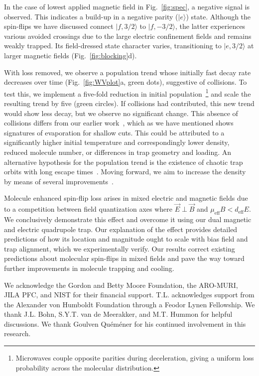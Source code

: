 \documentclass[%
 reprint,
 amsmath,amssymb,
 aps,
prl,
]{revtex4-1}
\newcommand{\red}[1]{{\color{black} #1}}
\newcommand{\epb}{{$\vec{E}\!\perp\!\vec{B}$}}
\begin{document}
In the case of lowest applied magnetic field in Fig.~\ref{fig:spec}, a negative signal is observed. 
This indicates a build-up in a negative parity ($|e\rangle$) state. 
Although the spin-flips we have discussed connect $|f,3/2\rangle$ to $|f,-3/2\rangle$, the latter experiences various avoided crossings due to the large electric confinement fields and remains weakly trapped.  
Its field-dressed state character varies, transitioning to $|e,3/2\rangle$ at larger magnetic fields (Fig.~\ref{fig:blocking}d). 

With loss removed, we observe a population trend whose initially fast decay rate decreases over time (Fig.~\ref{fig:WVplot}a, green dots), suggestive of collisions. 
To test this, we implement a five-fold reduction in initial population~\footnote{Microwaves couple opposite parities during deceleration, giving a uniform loss probability across the molecular distribution.} and scale the resulting trend by five (green circles). 
If collisions had contributed, this new trend would show less decay, but we observe no significant change. 
This absence of collisions differs from our earlier work~\cite{Stuhl2012evap}, which as we have mentioned shows signatures of evaporation for shallow cuts. 
This could be attributed to a significantly higher initial temperature and correspondingly lower density, reduced molecule number, or differences in trap geometry and loading. 
\red{An alternative hypothesis for the population trend is the existence of chaotic trap orbits with long escape times~\cite{Gonzalez-Ferez2014}.} 
Moving forward, we aim to increase the density by means of several improvements~\cite{Even2015,Segev2017}.



Molecule enhanced spin-flip loss arises in mixed electric and magnetic fields due to a competition between field quantization axes where \epb{} and $\mu_\text{eff}B<d_\text{eff}E$. 
We conclusively demonstrate this effect and overcome it using our dual magnetic and electric quadrupole trap. 
Our explanation of the effect provides detailed predictions of how its location and magnitude ought to scale with bias field and trap alignment, which we experimentally verify. 
Our results correct existing predictions about molecular spin-flips in mixed fields and pave the way toward further improvements in molecule trapping and cooling.

\acknowledgements
We acknowledge the Gordon and Betty Moore Foundation, the ARO-MURI, JILA PFC, and NIST for their financial support. 
T.L. acknowledges support from the Alexander von Humboldt Foundation through a Feodor Lynen Fellowship. 
We thank J.L. Bohn, S.Y.T. van de Meerakker, and M.T. Hummon for helpful discussions. 
We thank Goulven Qu\'em\'ener for his continued involvement in this research.


%
\end{document}
